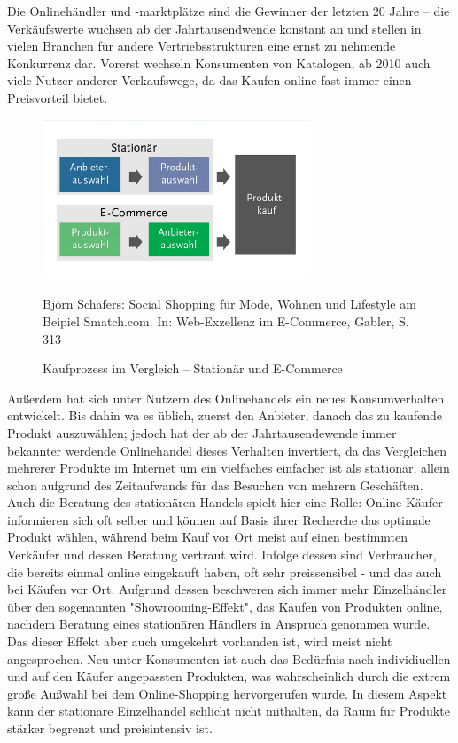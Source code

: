 \begin{folding}
Die Onlinehändler und -marktplätze sind die Gewinner der letzten 20 Jahre – die Verkäufswerte wuchsen ab der Jahrtausendwende konstant an und stellen in vielen Branchen für andere Vertriebsstrukturen eine ernst zu nehmende Konkurrenz dar\cite{wolf}. Vorerst wechseln Konsumenten von Katalogen, ab 2010 auch viele Nutzer anderer Verkaufswege, da das Kaufen online fast immer einen Preisvorteil bietet\cite[S. 31]{Graf}.
\begin{figure}[h]
    \begin{center}
        \includegraphics[width=8cm]{media/Fabian-konsumwandel.png}
        \caption{Kaufprozess im Vergleich – Stationär und E-Commerce}
        \label{konsumwandel}
        \bildquelle Björn Schäfers: Social Shopping für Mode, Wohnen und Lifestyle am Beipiel Smatch.com. In: Web-Exzellenz im E-Commerce, Gabler, S. 313 %
    \end{center}
\end{figure} 
Außerdem hat sich unter Nutzern des Onlinehandels ein neues Konsumverhalten entwickelt. Bis dahin wa es üblich, zuerst den Anbieter, danach das zu kaufende Produkt auszuwählen; jedoch hat der ab der Jahrtausendewende immer bekannter werdende Onlinehandel dieses Verhalten invertiert, da das Vergleichen mehrerer Produkte im Internet um ein vielfaches einfacher ist als stationär, allein schon aufgrund des Zeitaufwands für das Besuchen von mehrern Geschäften\cite[S 22f]{Graf}. Auch die Beratung des stationären Handels spielt hier eine Rolle: Online-Käufer informieren sich oft selber und können auf Basis ihrer Recherche das optimale Produkt wählen, während beim Kauf vor Ort meist auf einen bestimmten Verkäufer und dessen Beratung vertraut wird\cite[S. 15f]{evilcom}. Infolge dessen sind Verbraucher, die bereits einmal online eingekauft haben, oft sehr preissensibel - und das auch bei Käufen vor Ort\cite[S. 60]{Nitt}. Aufgrund dessen beschweren sich immer mehr Einzelhändler über den sogenannten "Showrooming-Effekt", das Kaufen von Produkten online, nachdem Beratung eines stationären Händlers in Anspruch genommen wurde. Das dieser Effekt aber auch umgekehrt vorhanden ist, wird meist nicht angesprochen\cite[S. 21f]{evilcom}.
Neu unter Konsumenten ist auch das Bedürfnis nach individiuellen und auf den Käufer angepassten Produkten\cite[S. 43]{Nitt}, was wahrscheinlich durch die extrem große Außwahl bei dem Online-Shopping hervorgerufen wurde. In diesem Aspekt kann der stationäre Einzelhandel schlicht nicht mithalten, da Raum für Produkte stärker begrenzt und preisintensiv ist.

\end{folding}

